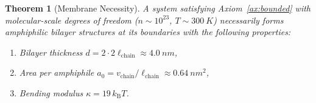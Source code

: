 \documentclass[twocolumn,10pt]{article}
\newtheorem{theorem}{Theorem}[section]
\theoremstyle{definition}
\theoremstyle{remark}
\newcommand{\kB}{k_{\mathrm{B}}}
\begin{document}
\begin{theorem}[Membrane Necessity]
\label{thm:membrane_necessity}
A system satisfying Axiom~\ref{ax:bounded} with molecular-scale degrees of freedom ($n \sim 10^{23}$, $T \sim \SI{300}{K}$) necessarily forms amphiphilic bilayer structures at its boundaries with the following properties:
\begin{enumerate}[label=(\alph*)]
  \item Bilayer thickness $d = 2 \cdot 2\ell_{\mathrm{chain}} \approx \SI{4.0}{nm}$,
  \item Area per amphiphile $a_0 = v_{\mathrm{chain}}/\ell_{\mathrm{chain}} \approx \SI{0.64}{nm^2}$,
  \item Bending modulus $\kappa = 19\,\kB T$.
\end{enumerate}
\end{theorem}
\end{document}
